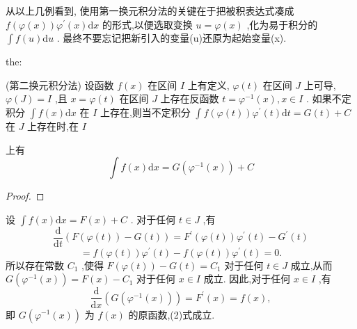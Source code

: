 从以上几例看到, 使用第一换元积分法的关键在于把被积表达式凑成 \(f\left( {\varphi \left( x\right) }\right) {\varphi }^{\prime }\left( x\right) \mathrm{d}x\) 的形式,以便选取变换 \(u = \varphi \left( x\right)\) ,化为易于积分的 \(\int f\left( u\right) \mathrm{d}u\) . 最终不要忘记把新引入的变量(u)还原为起始变量(x).

\begin{theorem}{}{the:}

\end{theorem}
 (第二换元积分法) 设函数 \(f\left( x\right)\) 在区间 \(I\) 上有定义, \(\varphi \left( t\right)\) 在区间 \(J\) 上可导, \(\varphi \left( J\right)  = I\) ,且 \(x = \varphi \left( t\right)\) 在区间 \(J\) 上存在反函数 \(t = {\varphi }^{-1}\left( x\right) ,x \in  I\) . 如果不定积分 \(\int f\left( x\right) \mathrm{d}x\) 在 \(I\) 上存在,则当不定积分 \(\int f\left( {\varphi \left( t\right) }\right) {\varphi }^{\prime }\left( t\right) \mathrm{d}t = G\left( t\right)  + C\) 在 \(J\) 上存在时,在 \(I\)

上有
\[
\int f\left( x\right) \mathrm{d}x = G\left( {{\varphi }^{-1}\left( x\right) }\right)  + C \tag{2}
\]
\begin{proof}

\end{proof}
设 \(\int f\left( x\right) \mathrm{d}x = F\left( x\right)  + C\) . 对于任何 \(t \in  J\) ,有
\[
\frac{\mathrm{d}}{\mathrm{d}t}\left( {F\left( {\varphi \left( t\right) }\right)  - G\left( t\right) }\right)  = {F}^{\prime }\left( {\varphi \left( t\right) }\right) {\varphi }^{\prime }\left( t\right)  - {G}^{\prime }\left( t\right)
\]
\[
= f\left( {\varphi \left( t\right) }\right) {\varphi }^{\prime }\left( t\right)  - f\left( {\varphi \left( t\right) }\right) {\varphi }^{\prime }\left( t\right)  = 0.
\]
所以存在常数 \({C}_{1}\) ,使得 \(F\left( {\varphi \left( t\right) }\right)  - G\left( t\right)  = {C}_{1}\) 对于任何 \(t \in  J\) 成立,从而 \(G\left( {{\varphi }^{-1}\left( x\right) }\right)  = F\left( x\right)  - {C}_{1}\) 对于任何 \(x \in  I\) 成立. 因此,对于任何 \(x \in  I\) ,有
\[
\frac{\mathrm{d}}{\mathrm{d}x}\left( {G\left( {{\varphi }^{-1}\left( x\right) }\right) }\right)  = {F}^{\prime }\left( x\right)  = f\left( x\right) ,
\]
即 \(G\left( {{\varphi }^{-1}\left( x\right) }\right)\) 为 \(f\left( x\right)\) 的原函数,(2)式成立.

